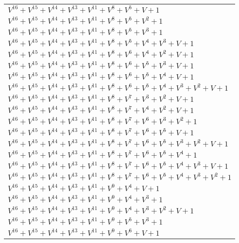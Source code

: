 \documentclass[12pt]{article}
\begin{document}
\begin{adjustwidth}{-4cm}{}
\begin{center}
\begin{longtable}{|l|}
$V^{16}  +V^{15}  +V^{14}  +V^{13}  +V^{11}  +V^{8}  +V^{5}  + V + 1$ \\
$V^{16}  +V^{15}  +V^{14}  +V^{13}  +V^{11}  +V^{8}  +V^{5}  +V^{2}  + 1$ \\
$V^{16}  +V^{15}  +V^{14}  +V^{13}  +V^{11}  +V^{8}  +V^{5}  +V^{3}  + 1$ \\
$V^{16}  +V^{15}  +V^{14}  +V^{13}  +V^{11}  +V^{8}  +V^{5}  +V^{4}  +V^{3}  + V + 1$ \\
$V^{16}  +V^{15}  +V^{14}  +V^{13}  +V^{11}  +V^{8}  +V^{6}  +V^{4}  +V^{2}  + V + 1$ \\
$V^{16}  +V^{15}  +V^{14}  +V^{13}  +V^{11}  +V^{8}  +V^{6}  +V^{5}  +V^{3}  + V + 1$ \\
$V^{16}  +V^{15}  +V^{14}  +V^{13}  +V^{11}  +V^{8}  +V^{6}  +V^{5}  +V^{4}  + V + 1$ \\
$V^{16}  +V^{15}  +V^{14}  +V^{13}  +V^{11}  +V^{8}  +V^{6}  +V^{5}  +V^{4}  +V^{3}  +V^{2}  + V + 1$ \\
$V^{16}  +V^{15}  +V^{14}  +V^{13}  +V^{11}  +V^{8}  +V^{7}  +V^{3}  +V^{2}  + V + 1$ \\
$V^{16}  +V^{15}  +V^{14}  +V^{13}  +V^{11}  +V^{8}  +V^{7}  +V^{4}  +V^{2}  + V + 1$ \\
$V^{16}  +V^{15}  +V^{14}  +V^{13}  +V^{11}  +V^{8}  +V^{7}  +V^{6}  +V^{3}  +V^{2}  + 1$ \\
$V^{16}  +V^{15}  +V^{14}  +V^{13}  +V^{11}  +V^{8}  +V^{7}  +V^{6}  +V^{5}  + V + 1$ \\
$V^{16}  +V^{15}  +V^{14}  +V^{13}  +V^{11}  +V^{8}  +V^{7}  +V^{6}  +V^{5}  +V^{3}  +V^{2}  + V + 1$ \\
$V^{16}  +V^{15}  +V^{14}  +V^{13}  +V^{11}  +V^{8}  +V^{7}  +V^{6}  +V^{5}  +V^{4}  + 1$ \\
$V^{16}  +V^{15}  +V^{14}  +V^{13}  +V^{11}  +V^{8}  +V^{7}  +V^{6}  +V^{5}  +V^{4}  +V^{3}  + V + 1$ \\
$V^{16}  +V^{15}  +V^{14}  +V^{13}  +V^{11}  +V^{8}  +V^{7}  +V^{6}  +V^{5}  +V^{4}  +V^{3}  +V^{2}  + 1$ \\
$V^{16}  +V^{15}  +V^{14}  +V^{13}  +V^{11}  +V^{9}  +V^{4}  + V + 1$ \\
$V^{16}  +V^{15}  +V^{14}  +V^{13}  +V^{11}  +V^{9}  +V^{4}  +V^{3}  + 1$ \\
$V^{16}  +V^{15}  +V^{14}  +V^{13}  +V^{11}  +V^{9}  +V^{4}  +V^{3}  +V^{2}  + V + 1$ \\
$V^{16}  +V^{15}  +V^{14}  +V^{13}  +V^{11}  +V^{9}  +V^{5}  +V^{3}  + 1$ \\
$V^{16}  +V^{15}  +V^{14}  +V^{13}  +V^{11}  +V^{9}  +V^{6}  + V + 1$ \\

\end{longtable}
\end{center}
\end{adjustwidth}
\end{document}
